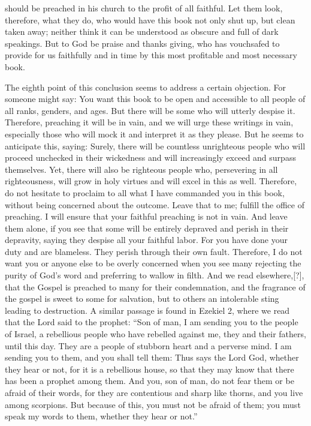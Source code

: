 should be preached in his church to the profit of all faithful. Let them look, therefore, what they do, who would have this book not only shut up, but clean taken away; neither think it can be understood as obscure and full of dark speakings. But to God be praise and thanks giving, who has vouchsafed to provide for us faithfully and in time by this most profitable and most necessary book.

The eighth point of this conclusion seems to address a certain objection. For someone might say: You want this book to be open and accessible to all people of all ranks, genders, and ages. But there will be some who will utterly despise it. Therefore, preaching it will be in vain, and we will urge these writings in vain, especially those who will mock it and interpret it as they please. But he seems to anticipate this, saying: Surely, there will be countless unrighteous people who will proceed unchecked in their wickedness and will increasingly exceed and surpass themselves. Yet, there will also be righteous people who, persevering in all righteousness, will grow in holy virtues and will excel in this as well. Therefore, do not hesitate to proclaim to all what I have commanded you in this book, without being concerned about the outcome. Leave that to me; fulfill the office of preaching. I will ensure that your faithful preaching is not in vain. And leave them alone, if you see that some will be entirely depraved and perish in their depravity, saying they despise all your faithful labor. For you have done your duty and are blameless. They perish through their own fault. Therefore, I do not want you or anyone else to be overly concerned when you see many rejecting the purity of God’s word and preferring to wallow in filth. And we read elsewhere,[?], that the Gospel is preached to many for their condemnation, and the fragrance of the gospel is sweet to some for salvation, but to others an intolerable sting leading to destruction. A similar passage is found in Ezekiel 2, where we read that the Lord said to the prophet: “Son of man, I am sending you to the people of Israel, a rebellious people who have rebelled against me, they and their fathers, until this day. They are a people of stubborn heart and a perverse mind. I am sending you to them, and you shall tell them: Thus says the Lord God, whether they hear or not, for it is a rebellious house, so that they may know that there has been a prophet among them. And you, son of man, do not fear them or be afraid of their words, for they are contentious and sharp like thorns, and you live among scorpions. But because of this, you must not be afraid of them; you must speak my words to them, whether they hear or not.”

